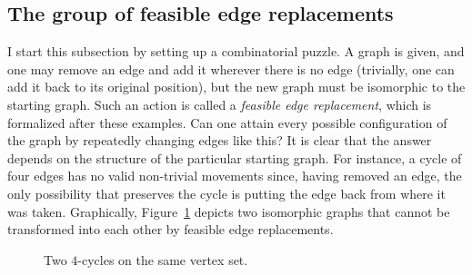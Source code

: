 \subsection{The group of feasible edge replacements}\label{subsec:fer}

I start this subsection by setting up a combinatorial puzzle.
A graph is given, and one may remove an edge and add it wherever there is no edge (trivially, one can add it back to its original position), but the new graph must be isomorphic to the starting graph.
Such an action is called a \emph{feasible edge replacement}, which is formalized after these examples.
Can one attain every possible configuration of the graph by repeatedly changing edges like this?
It is clear that the answer depends on the structure of the particular starting graph.
For instance, a cycle of four edges has no valid non-trivial movements since, having removed an edge, the only possibility that preserves the cycle is putting the edge back from where it was taken.
Graphically, Figure~\ref{fig:4_cycles} depicts two isomorphic graphs that cannot be transformed into each other by feasible edge replacements.

\begin{figure}[htbp]
\centering
\begin{subfigure}[b]{0.4\textwidth}
    \centering
\end{subfigure}
\hfill
\begin{subfigure}[b]{0.4\textwidth}
    \centering
\end{subfigure}
\caption{Two $4$-cycles on the same vertex set.}
\label{fig:4_cycles}
\end{figure}

